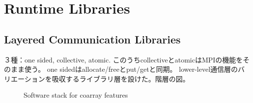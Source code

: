 \section{Runtime Libraries}\label{sec:runtime}

\subsection{Layered Communication Libraries}

３種：one sided, collective, atomic. このうちcollectiveとatomicはMPIの機能をそのまま使う。
one sidedはallocate/freeとput/getと同期。
lower-level通信層のバリエーションを吸収するライブラリ層を設けた。階層の図。

\begin{figure}[tbh]
  \begin{center}
    \caption{Software stack for coarray features}\label{fig:layer}
  \end{center}
\end{figure}



